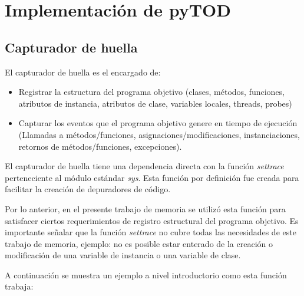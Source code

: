 \documentclass[12pt,legalpaper]{report}
\begin{document}
	\section{Implementación de pyTOD}
		\subsection{Capturador de huella}
		
El capturador de huella es el encargado de: 

\begin{itemize}
	\item Registrar la estructura del programa objetivo (clases, métodos, funciones, atributos de instancia, atributos de clase, variables locales, threads, probes)
	\item Capturar los eventos que el programa objetivo genere en tiempo de ejecución (Llamadas a métodos/funciones, asignaciones/modificaciones, instanciaciones, retornos de métodos/funciones, excepciones). 
\end{itemize}

El capturador de huella tiene una dependencia directa con la función \textit{settrace} \cite{settrace} perteneciente al módulo estándar \textit{sys}.  Esta función por definición fue creada para facilitar la creación de depuradores de código.

Por lo anterior, en el presente trabajo de memoria se utilizó esta función para satisfacer ciertos requerimientos de registro estructural del programa objetivo.  Es importante señalar que la función \textit{settrace} no cubre todas las necesidades de este trabajo de memoria, ejemplo: no es posible estar enterado de la creación o modificación de una variable de instancia o una variable de clase.

A continuación se muestra un ejemplo a nivel introductorio como esta función trabaja:
\end{document}
